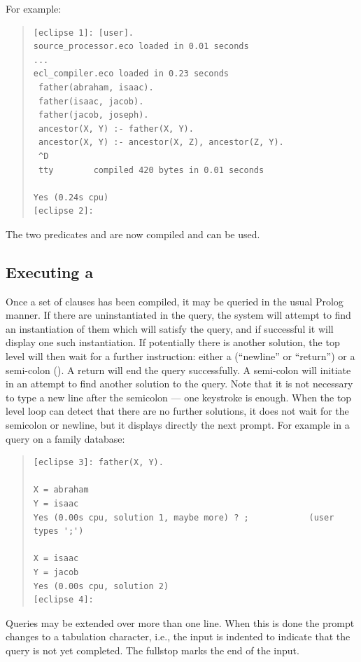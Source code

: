 For example:
\begin{quote}
\begin{verbatim}
[eclipse 1]: [user].
source_processor.eco loaded in 0.01 seconds
...
ecl_compiler.eco loaded in 0.23 seconds
 father(abraham, isaac).
 father(isaac, jacob).
 father(jacob, joseph).
 ancestor(X, Y) :- father(X, Y).
 ancestor(X, Y) :- ancestor(X, Z), ancestor(Z, Y).
 ^D
 tty        compiled 420 bytes in 0.01 seconds

Yes (0.24s cpu)
[eclipse 2]:
\end{verbatim}
\end{quote}
The two predicates  and  are now
compiled
and can be used.

\subsection{Executing a }

Once a set of clauses has been compiled,
it may be queried in the usual Prolog manner.
If there are uninstantiated  in the query,
the system will attempt to find an instantiation of them which will
satisfy the query, and if successful it will
display one such instantiation.
If potentially there is another solution, the top level
will then wait for a further instruction: either a 
(``newline'' or ``return'') or a semi-colon (\notation{;}).
A return will end the query successfully.
A semi-colon will initiate 
in an attempt to find another solution to the query.
Note that it is not necessary to type a new line after the semicolon
--- one keystroke is enough.
When the top level loop can detect
that there are no further solutions, it does not wait for the semicolon
or newline, but it displays directly the next prompt.
For example in a query on
a family database:
\begin{quote}
\begin{verbatim}
[eclipse 3]: father(X, Y).

X = abraham
Y = isaac
Yes (0.00s cpu, solution 1, maybe more) ? ;            (user types ';')

X = isaac
Y = jacob
Yes (0.00s cpu, solution 2)
[eclipse 4]:
\end{verbatim}
\end{quote}

Queries may be extended over more than one line. When this is done the prompt
changes to a tabulation character, i.e., the input is indented to
indicate that the query is not yet completed.
The fullstop marks the end of the input.

